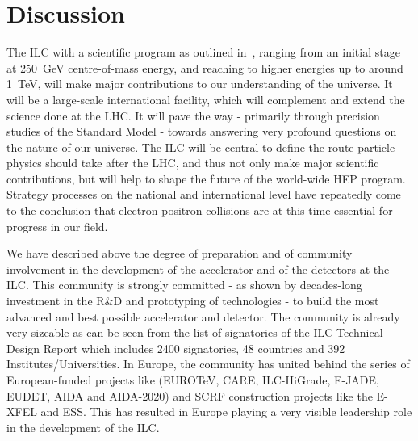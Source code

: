 \documentclass[%
 reprint,
 floatfix,
 amsmath,amssymb,
 aps,
]{revtex4-1}
\begin{document}
\section{\label{sec:discussion}Discussion}
The ILC with a scientific program as outlined in~\cite{ILCforESS}, ranging from 
an initial stage at 250~GeV centre-of-mass energy, and reaching to higher 
energies up to around 1~TeV, will make major contributions to our understanding of the universe. 
It will be a large-scale international facility, which will 
complement and extend the science done at the LHC. It will pave the way - 
primarily through precision studies of the Standard Model - towards answering 
very profound questions on the nature of our universe. The ILC will be central to 
define the route particle physics should take after the LHC, and thus not only 
make major scientific contributions, but will help to shape the future of the 
world-wide HEP program. Strategy processes on the national and 
international level have repeatedly come to the conclusion that electron-positron collisions 
are at this time essential for progress in our field. 


We have described above the degree of preparation and of community involvement 
in the development of the accelerator and of the detectors at the ILC. This 
community is strongly committed - as shown by decades-long investment in the 
R\&D and prototyping of technologies - to build the most advanced and best 
possible accelerator and detector. The community is already very sizeable as can be seen from the list of signatories of the ILC Technical Design Report which includes 2400 signatories, 48 countries and 392 Institutes/Universities. In Europe, the community has united behind the 
series of  European-funded projects like (EUROTeV, CARE, ILC-HiGrade, E-JADE, EUDET, AIDA and AIDA-2020) and SCRF construction projects like the E-XFEL and ESS. This has 
resulted in Europe playing a very visible leadership role in the development of the ILC.



\end{document}
